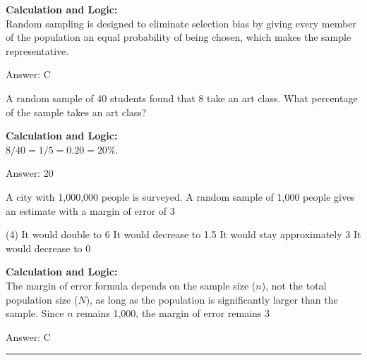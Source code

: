 \documentclass[11pt,paper=a4,answers]{exam}
\begin{document}
\begin{questions}
\begin{solution}
\textbf{Calculation and Logic:} \\
Random sampling is designed to eliminate selection bias by giving every member of the population an equal probability of being chosen, which makes the sample representative.

\vspace{30pt}

Answer: \colorbox{yellow!100}{C}
\end{solution}

\vspace{60pt}

\question
A random sample of 40 students found that 8 take an art class. What percentage of the sample takes an art class?

\begin{solution}
\textbf{Calculation and Logic:} \\
$8 / 40 = 1 / 5 = 0.20 = 20\%$.

\vspace{30pt}

Answer: \colorbox{yellow!100}{20}
\end{solution}

\vspace{60pt}

\question
A city with 1,000,000 people is surveyed. A random sample of 1,000 people gives an estimate with a margin of error of 3%
\begin{tasks}(4)
    \task It would double to 6%
    \task It would decrease to 1.5%
    \task It would stay approximately 3%
    \task It would decrease to 0%
\end{tasks}

\begin{solution}
\textbf{Calculation and Logic:} \\
The margin of error formula depends on the sample size ($n$), not the total population size ($N$), as long as the population is significantly larger than the sample. Since $n$ remains 1,000, the margin of error remains 3%

\vspace{30pt}

Answer: \colorbox{yellow!100}{C}
\end{solution}

\end{questions}
\begin{center}
\rule{.5\textwidth}{1pt}
\end{center}
\end{document}
